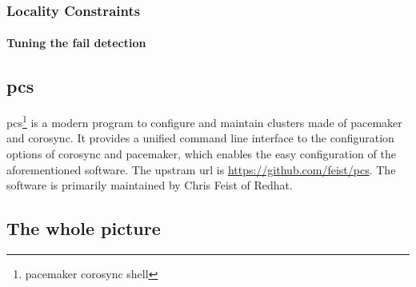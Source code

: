 \subsubsection{Locality Constraints}
\paragraph{Tuning the fail detection}
\subsection{pcs}
pcs\footnote{pacemaker corosync shell} is a modern program to configure and maintain clusters made of pacemaker and corosync. It provides a unified command line interface to the configuration options of corosync and pacemaker, which enables the easy configuration of the aforementioned software.
The upstram url is \url{https://github.com/feist/pcs}. The software is primarily maintained by Chris Feist of Redhat.
\subsection{The whole picture}
